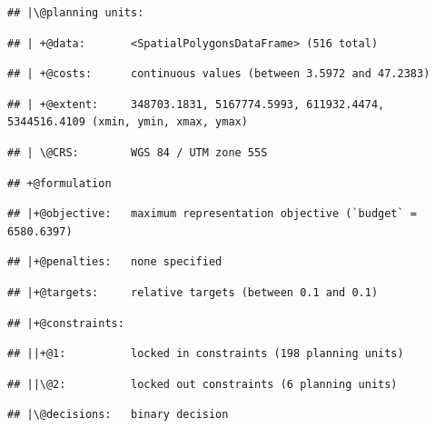 \documentclass[12pt,]{book}
\begin{document}
\begin{verbatim}
## |\@planning units:
\end{verbatim}

\begin{verbatim}
## | +@data:       <SpatialPolygonsDataFrame> (516 total)
\end{verbatim}

\begin{verbatim}
## | +@costs:      continuous values (between 3.5972 and 47.2383)
\end{verbatim}

\begin{verbatim}
## | +@extent:     348703.1831, 5167774.5993, 611932.4474, 5344516.4109 (xmin, ymin, xmax, ymax)
\end{verbatim}

\begin{verbatim}
## | \@CRS:        WGS 84 / UTM zone 55S
\end{verbatim}

\begin{verbatim}
## +@formulation
\end{verbatim}

\begin{verbatim}
## |+@objective:   maximum representation objective (`budget` = 6580.6397)
\end{verbatim}

\begin{verbatim}
## |+@penalties:   none specified
\end{verbatim}

\begin{verbatim}
## |+@targets:     relative targets (between 0.1 and 0.1)
\end{verbatim}

\begin{verbatim}
## |+@constraints:
\end{verbatim}

\begin{verbatim}
## ||+@1:          locked in constraints (198 planning units)
\end{verbatim}

\begin{verbatim}
## ||\@2:          locked out constraints (6 planning units)
\end{verbatim}

\begin{verbatim}
## |\@decisions:   binary decision
\end{verbatim}
\end{document}
